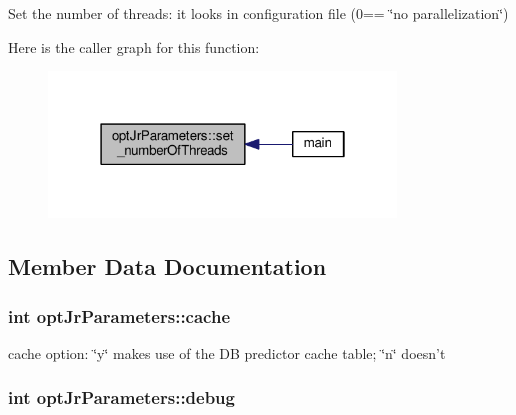 Set the number of threads\-: it looks in configuration file (0== \char`\"{}no parallelization\char`\"{}) 



Here is the caller graph for this function\-:\nopagebreak
\begin{figure}[H]
\begin{center}
\leavevmode
\includegraphics[width=262pt]{classoptJrParameters_a3747d78e5dd35b8b1aa1c037e9d91cf7_icgraph}
\end{center}
\end{figure}




\subsection{Member Data Documentation}
\hypertarget{classoptJrParameters_a62b46c4db0655e8aea32e2929996d626}{
\subsubsection[{cache}]{\setlength{\rightskip}{0pt plus 5cm}int opt\-Jr\-Parameters\-::cache\hspace{0.3cm}{\ttfamily [private]}}}\label{classoptJrParameters_a62b46c4db0655e8aea32e2929996d626}


cache option\-: \char`\"{}y\char`\"{} makes use of the D\-B predictor cache table; \char`\"{}n\char`\"{} doesn't 

\hypertarget{classoptJrParameters_aeac321db6ab6babd047c06696a260e90}{
\subsubsection[{debug}]{\setlength{\rightskip}{0pt plus 5cm}int opt\-Jr\-Parameters\-::debug\hspace{0.3cm}{\ttfamily [private]}}}\label{classoptJrParameters_aeac321db6ab6babd047c06696a260e90}


